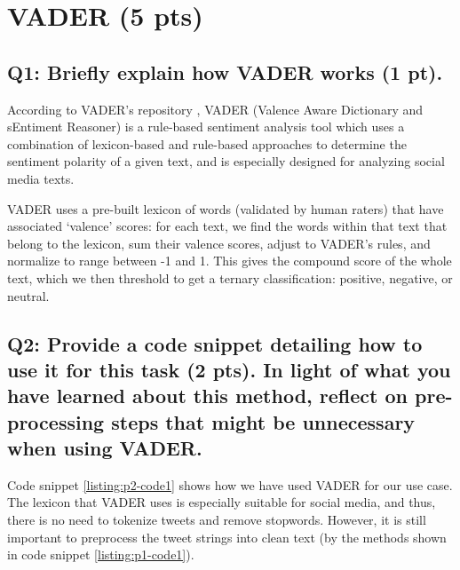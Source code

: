 \section*{VADER (5 pts)}

\subsection*{Q1: Briefly explain how VADER works (1 pt).}

According to VADER’s repository \cite{vader}, VADER (Valence Aware Dictionary and sEntiment Reasoner) is a rule-based sentiment analysis tool which uses a combination of lexicon-based and rule-based approaches to determine the sentiment polarity of a given text, and is especially designed for analyzing social media texts.

VADER uses a pre-built lexicon of words (validated by human raters) that have associated ‘valence’ scores: for each text, we find the words within that text that belong to the lexicon, sum their valence scores, adjust to VADER’s rules, and normalize to range between -1 and 1. This gives the compound score of the whole text, which we then threshold to get a ternary classification: positive, negative, or neutral.


\subsection*{Q2: Provide a code snippet detailing how to use it for this task (2 pts). In light of what you have learned about this method, reflect on pre-processing steps that might be unnecessary when using VADER.}

Code snippet \cref{listing:p2-code1} shows how we have used VADER for our use case. The lexicon that VADER uses is especially suitable for social media, and thus, there is no need to tokenize tweets and remove stopwords. However, it is still important to preprocess the tweet strings into clean text (by the methods shown in code snippet \cref{listing:p1-code1}).

